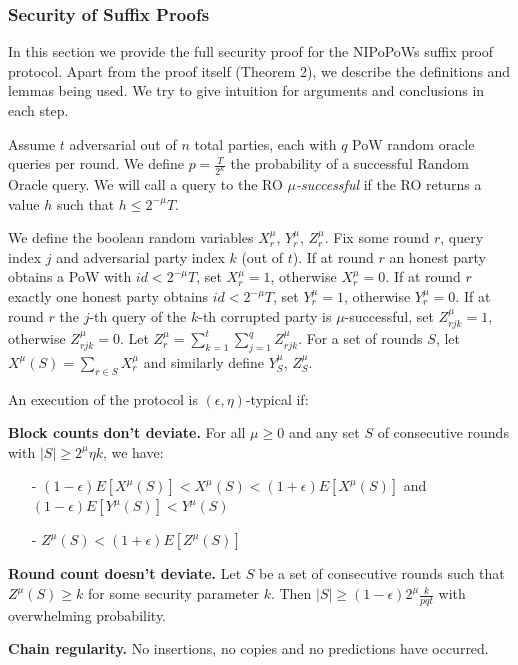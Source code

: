 \subsubsection{Security of Suffix Proofs} \label{proof_under_hard_fork}
In this section we provide the full security proof for the NIPoPoWs suffix proof
protocol\cite{nipopows}. Apart from the proof itself (Theorem 2), we describe the
definitions and lemmas being used. We try to give intuition for arguments and
conclusions in each step.

Assume $t$ adversarial out of $n$ total parties, each with $q$ PoW random oracle
queries per round. We define $p = \frac{T}{2^\kappa}$ the probability of a
successful Random Oracle query. We will call a query to the RO $\mu$\textit{-successful}
if the RO returns a value $h$ such that $h \leq 2^{-\mu}T$.

We define the boolean random variables $X_r^{\mu}$, $Y_r^{\mu}$, $Z_r^{\mu}$.
Fix some round $r$, query index $j$ and adversarial party index $k$ (out of $t$).
If at round $r$ an honest party obtains a PoW with $id < 2^{-\mu}T$, set $X_r^{\mu} = 1$,
otherwise $X_r^{\mu} = 0$. If at round $r$ exactly one honest party obtains
$id < 2^{-\mu}T$, set $Y_r^{\mu} = 1$, otherwise $Y_r^{\mu} = 0$. If at round $
r$ the $j$-th query of the $k$-th corrupted party is $\mu$-successful, set
$Z_{rjk}^{\mu} = 1$, otherwise $Z_{rjk}^{\mu} = 0$. Let $Z_r^{\mu} =
\sum_{k=1}^t\sum_{j=1}^qZ_{rjk}^{\mu}$. For a set of rounds $S$, let
$X^\mu(S) = \sum_{r \in S}X^{\mu}_r$ and similarly define $Y_S^{\mu}$, $Z_S^{\mu}$.\\

\begin{defn}
	An execution of the protocol is $(\epsilon, \eta)$-typical if:
	
	\textbf{Block counts don't deviate.} For all $\mu \geq 0$ and any set
	$S$ of consecutive rounds with $\vert S \vert \geq 2^\mu \eta k$, we have:
	\begin{itemize}
		\item[-] $(1-\epsilon)E[X^\mu(S)] < X^\mu(S) < (1+\epsilon)E[X^\mu(S)] $ and
			$(1-\epsilon)E[Y^\mu(S)] < Y^\mu(S)$
		\item[-] $Z^\mu(S) < (1+\epsilon)E[Z^\mu(S)]$
\end{itemize}

	\textbf{Round count doesn't deviate.} Let $S$ be a set of consecutive rounds
	such that $Z^\mu(S) \geq k$ for some security parameter $k$. Then $\vert S \vert
	\geq (1-\epsilon)2^\mu \frac{k}{pqt}$ with overwhelming probability.
	
	\textbf{Chain regularity.} No insertions, no copies and no predictions
	\cite{backbone} have occurred.
	\label{defn:typical_execution}
\end{defn}

